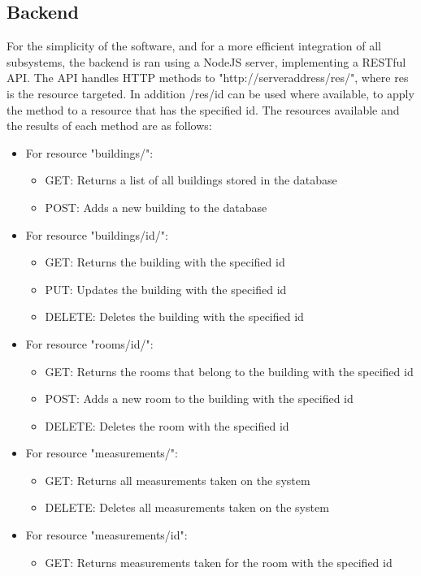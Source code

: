 \subsection{Backend}
For the simplicity of the software, and for a more efficient integration of all subsystems, the backend is ran using a NodeJS server, implementing a RESTful API.
The API handles HTTP methods to "http://serveraddress/res/", where res is the resource targeted. In addition /res/id can be used where available, to apply the method to a resource that has the specified id.
The resources available and the results of each method are as follows:
\begin{itemize}
\item For resource "buildings/":
	\begin{itemize}
	\item GET: Returns a list of all buildings stored in the database
	\item POST: Adds a new building to the database
	\end{itemize}
\item For resource "buildings/id/":
	\begin{itemize}
	\item GET: Returns the building with the specified id
	\item PUT: Updates the building with the specified id
	\item DELETE: Deletes the building with the specified id
	\end{itemize}
\item For resource "rooms/id/":
	\begin{itemize}
	\item GET: Returns the rooms that belong to the building with the specified id
	\item POST: Adds a new room to the building with the specified id
	\item DELETE: Deletes the room with the specified id
	\end{itemize}
\item For resource "measurements/":
	\begin{itemize}
	\item GET: Returns all measurements taken on the system
	\item DELETE: Deletes all measurements taken on the system
	\end{itemize}
\item For resource "measurements/id":
	\begin{itemize}
	\item GET: Returns measurements taken for the room with the specified id

\end{itemize}
\end{itemize}
